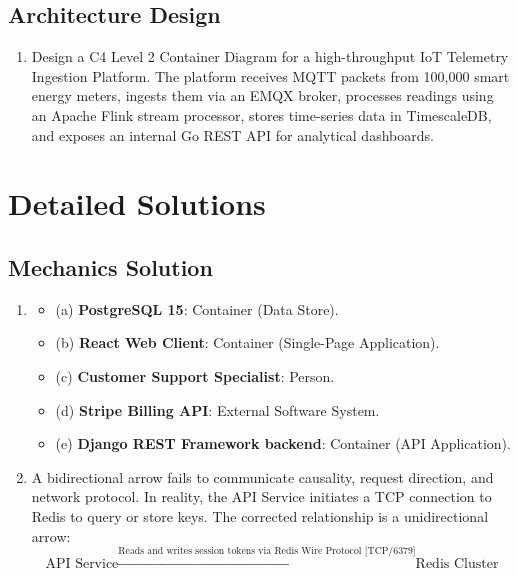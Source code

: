 \subsection*{Architecture Design}
\begin{enumerate}[leftmargin=18pt]
  \item Design a C4 Level 2 Container Diagram for a high-throughput IoT Telemetry Ingestion Platform. The platform receives MQTT packets from 100,000 smart energy meters, ingests them via an EMQX broker, processes readings using an Apache Flink stream processor, stores time-series data in TimescaleDB, and exposes an internal Go REST API for analytical dashboards.
\end{enumerate}

\section{Detailed Solutions}

\subsection*{Mechanics Solution}
\begin{enumerate}[leftmargin=18pt]
  \item 
  \begin{itemize}
    \item (a) \textbf{PostgreSQL 15}: Container (Data Store).
    \item (b) \textbf{React Web Client}: Container (Single-Page Application).
    \item (c) \textbf{Customer Support Specialist}: Person.
    \item (d) \textbf{Stripe Billing API}: External Software System.
    \item (e) \textbf{Django REST Framework backend}: Container (API Application).
  \end{itemize}
  \item A bidirectional arrow fails to communicate causality, request direction, and network protocol. In reality, the API Service initiates a TCP connection to Redis to query or store keys. The corrected relationship is a unidirectional arrow:
  $$\text{API Service} \xrightarrow{\text{Reads and writes session tokens via Redis Wire Protocol [TCP/6379]}} \text{Redis Cluster}$$
\end{enumerate}

